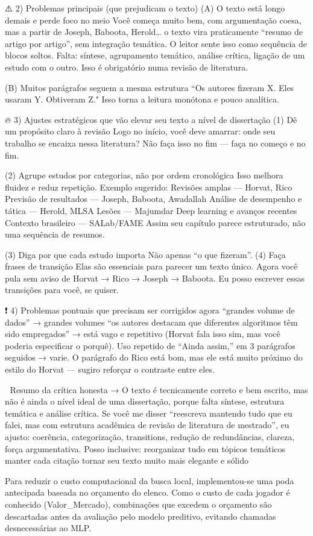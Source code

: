 ⚠️ 2) Problemas principais (que prejudicam o texto)
(A) O texto está longo demais e perde foco no meio
Você começa muito bem, com argumentação coesa, mas a partir de Joseph, Baboota, Herold… o texto vira praticamente “resumo de artigo por artigo”, sem integração temática.
O leitor sente isso como sequência de blocos soltos.
Falta:
síntese,
agrupamento temático,
análise crítica,
ligação de um estudo com o outro.
Isso é obrigatório numa revisão de literatura.

(B) Muitos parágrafos seguem a mesma estrutura
“Os autores fizeram X. Eles usaram Y. Obtiveram Z."
Isso torna a leitura monótona e pouco analítica.


🔥 3) Ajustes estratégicos que vão elevar seu texto a nível de dissertação
(1) Dê um propósito claro à revisão
Logo no início, você deve amarrar:
onde seu trabalho se encaixa nessa literatura?
Não faça isso no fim — faça no começo e no fim.

(2) Agrupe estudos por categorias, não por ordem cronológica
Isso melhora fluidez e reduz repetição.
Exemplo sugerido:
Revisões amplas — Horvat, Rico
Previsão de resultados — Joseph, Baboota, Awadallah
Análise de desempenho e tática — Herold, MLSA
Lesões — Majumdar
Deep learning e avanços recentes
Contexto brasileiro — SALab/FAME
Assim seu capítulo parece estruturado, não uma sequência de resumos.

(3) Diga por que cada estudo importa
Não apenas “o que fizeram”.
(4) Faça frases de transição
Elas são essenciais para parecer um texto único.
Agora você pula sem aviso de Horvat → Rico → Joseph → Baboota.
Eu posso escrever essas transições para você, se quiser.

❗ 4) Problemas pontuais que precisam ser corrigidos agora
“grandes volume de dados” → grandes volumes
“os autores destacam que diferentes algoritmos têm sido empregados” → está vago e repetitivo (Horvat fala isso sim, mas você poderia especificar o porquê).
Uso repetido de “Ainda assim,” em 3 parágrafos seguidos → varie.
O parágrafo do Rico está bom, mas ele está muito próximo do estilo do Horvat — sugiro reforçar o contraste entre eles.

🧠 Resumo da crítica honesta
→ O texto é tecnicamente correto e bem escrito, mas não é ainda o nível ideal de uma dissertação, porque falta síntese, estrutura temática e análise crítica.
Se você me disser “reescreva mantendo tudo que eu falei, mas com estrutura acadêmica de revisão de literatura de mestrado”, eu ajusto:
coerência,
categorização,
transitions,
redução de redundâncias,
clareza,
força argumentativa.
Posso inclusive:
reorganizar tudo em tópicos temáticos
manter cada citação
tornar seu texto muito mais elegante e sólido


Para reduzir o custo computacional da busca local, implementou-se uma poda antecipada baseada no orçamento do elenco. 
Como o custo de cada jogador é conhecido (Valor_Mercado), combinações que excedem o orçamento são descartadas antes da avaliação pelo modelo preditivo, 
evitando chamadas desnecessárias ao MLP.